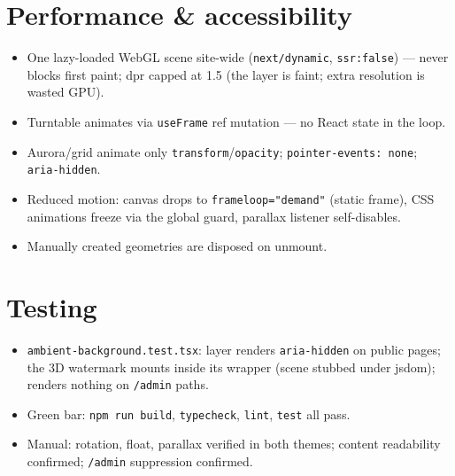 \documentclass[11pt,a4paper]{article}
\begin{document}
\section{Performance \& accessibility}
\begin{itemize}
  \item One lazy-loaded WebGL scene site-wide (\texttt{next/dynamic}, \texttt{ssr:false}) ---
        never blocks first paint; dpr capped at 1.5 (the layer is faint; extra resolution is
        wasted GPU).
  \item Turntable animates via \texttt{useFrame} ref mutation --- no React state in the loop.
  \item Aurora/grid animate only \texttt{transform}/\texttt{opacity};
        \texttt{pointer-events: none}; \texttt{aria-hidden}.
  \item Reduced motion: canvas drops to \texttt{frameloop="demand"} (static frame), CSS
        animations freeze via the global guard, parallax listener self-disables.
  \item Manually created geometries are disposed on unmount.
\end{itemize}

\section{Testing}
\begin{itemize}
  \item \texttt{ambient-background.test.tsx}: layer renders \texttt{aria-hidden} on public
        pages; the 3D watermark mounts inside its wrapper (scene stubbed under jsdom); renders
        nothing on \texttt{/admin} paths.
  \item Green bar: \texttt{npm run build}, \texttt{typecheck}, \texttt{lint}, \texttt{test}
        all pass.
  \item Manual: rotation, float, parallax verified in both themes; content readability
        confirmed; \texttt{/admin} suppression confirmed.
\end{itemize}

\end{document}
